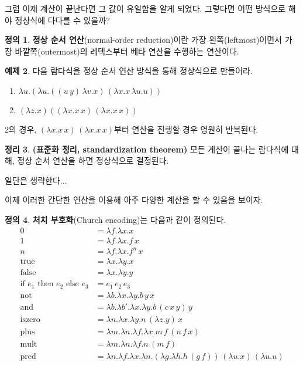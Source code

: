 \documentclass[b5paper, 11pt]{book}
\theoremstyle{definition}
\newtheorem{defn}{정의}[chapter]
\newtheorem{thm}[defn]{정리}
\newtheorem{ex}[defn]{예제}
\newenvironment{pf*}{\pushQED{\qed}\pf}
{\popQED\endpf}
\begin{document}
그럼 이제 계산이 끝난다면 그 값이 유일함을 알게 되었다. 그렇다면 어떤 방식으로 해야 정상식에
다다를 수 있을까?
\begin{defn}
    \textbf{정상 순서 연산}(normal-order reduction)이란 가장 왼쪽(leftmost)이면서 가장 
    바깥쪽(outermost)의 레덱스부터 베타 연산을 수행하는 연산이다.
\end{defn}
\begin{ex}
    다음 람다식을 정상 순서 연산 방식을 통해 정상식으로 만들어라.
    \begin{enumerate}
        \item $\lambda u. (\lambda u. ((u \, y) \, \lambda v. x) \, (\lambda x. x \, \lambda u. u))$
        \item $(\lambda z. x) ((\lambda x . x \, x) \, (\lambda x. x \, x))$
    \end{enumerate}
    2의 경우, $(\lambda x . x \, x) \, (\lambda x. x \, x)$부터 연산을 진행할 경우 영원히 반복된다.
\end{ex}
\begin{thm}
    \textbf{(표준화 정리, standardization theorem)} 모든 계산이 끝나는 람다식에 대해, 정상 순서 연산을 하면 정상식으로 결정된다.
\end{thm}
\begin{pf*}
    일단은 생략한다...
\end{pf*}
이제 이러한 간단한 연산을 이용해 아주 다양한 계산을 할 수 있음을 보이자.
\begin{defn}
    \textbf{처치 부호화}(Church encoding)는 다음과 같이 정의된다.
    \begin{align*}
        0 &= \lambda f. \lambda x. x \\ 
        1 &= \lambda f. \lambda x. f \, x  \\ 
        n &= \lambda f. \lambda x. f^n \, x \\
        \text{true} &= \lambda x. \lambda y. x \\ 
        \text{false} &= \lambda x. \lambda y. y \\ 
        \text{if } e_1 \text{ then } e_2 \text { else } e_3 &=
        e_1 \, e_2 \, e_3 \\ 
        \text{not} &= \lambda b. \lambda x. \lambda y. b \, y \, x \\ 
        \text{and} &= \lambda b. \lambda b'. \lambda x. \lambda y.
        b \, (c \, x \, y) \, y\\
        \text{iszero} &= \lambda n. \lambda x. \lambda y. n \, (\lambda z. y) \, x \\
        \text{plus} &= \lambda m. \lambda n. \lambda f. \lambda x. m \, f \, (n\, f\, x) \\
        \text{mult} &= \lambda m. \lambda n. \lambda f. n \, (m \, f)  \\ 
        \text{pred} &= \lambda n. \lambda f. \lambda x. \lambda n. (\lambda g. \lambda h.
        h \, (g \, f)) \, (\lambda u. x) \, (\lambda u. u)
    \end{align*}
\end{defn}
\end{document}
